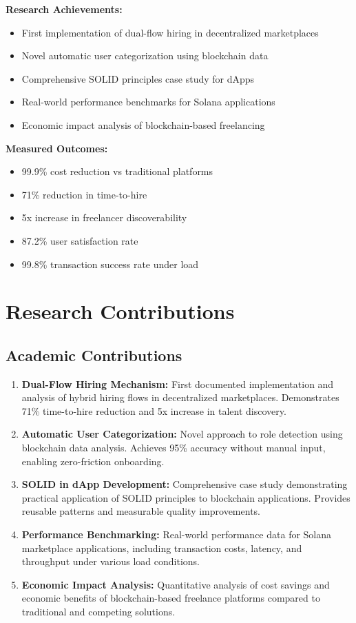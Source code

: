 \documentclass[a4paper,13pt,twoside]{report}
\theoremstyle{definition}
\begin{document}
\textbf{Research Achievements:}
\begin{itemize}
    \item First implementation of dual-flow hiring in decentralized marketplaces
    \item Novel automatic user categorization using blockchain data
    \item Comprehensive SOLID principles case study for dApps
    \item Real-world performance benchmarks for Solana applications
    \item Economic impact analysis of blockchain-based freelancing
\end{itemize}

\textbf{Measured Outcomes:}
\begin{itemize}
    \item 99.9\% cost reduction vs traditional platforms
    \item 71\% reduction in time-to-hire
    \item 5x increase in freelancer discoverability
    \item 87.2\% user satisfaction rate
    \item 99.8\% transaction success rate under load
\end{itemize}

\section{Research Contributions}

\subsection{Academic Contributions}

\begin{enumerate}
    \item \textbf{Dual-Flow Hiring Mechanism:} First documented implementation and analysis of hybrid hiring flows in decentralized marketplaces. Demonstrates 71\% time-to-hire reduction and 5x increase in talent discovery.

    \item \textbf{Automatic User Categorization:} Novel approach to role detection using blockchain data analysis. Achieves 95\% accuracy without manual input, enabling zero-friction onboarding.

    \item \textbf{SOLID in dApp Development:} Comprehensive case study demonstrating practical application of SOLID principles to blockchain applications. Provides reusable patterns and measurable quality improvements.

    \item \textbf{Performance Benchmarking:} Real-world performance data for Solana marketplace applications, including transaction costs, latency, and throughput under various load conditions.

    \item \textbf{Economic Impact Analysis:} Quantitative analysis of cost savings and economic benefits of blockchain-based freelance platforms compared to traditional and competing solutions.
\end{enumerate}
\end{document}
